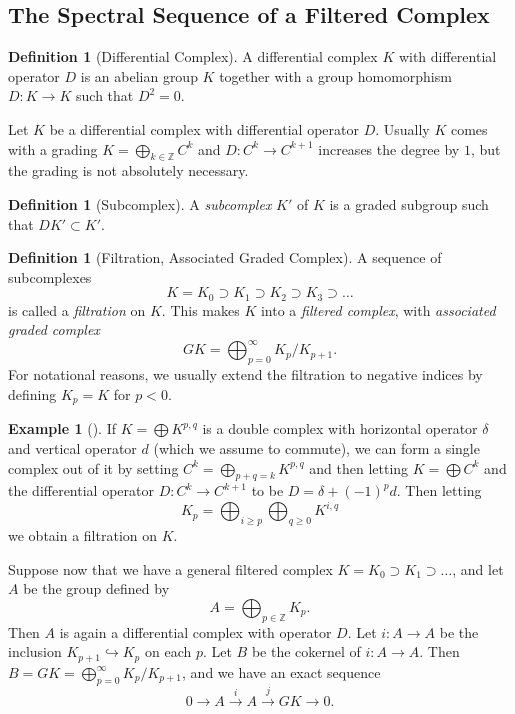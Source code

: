 \documentclass[reqno]{amsart}
\theoremstyle{definition}
\newtheorem{definition}[theorem]{Definition}
\newtheorem{example}[theorem]{Example}
\theoremstyle{remark}
\begin{document}
\subsection{The Spectral Sequence of a Filtered
Complex}

\begin{definition}[Differential Complex]
    A differential complex $K$ with differential operator
    $D$ is an abelian group $K$ together with
    a group homomorphism $D \colon K \to K$ such that
    $D^2 = 0$.
\end{definition}

Let $K$ be a differential complex with differential operator
$D$.
Usually $K$ comes with a grading
$K = \bigoplus_{k \in \mathbb{Z}}C^{k}$ and
$D \colon C^{k} \to C^{k+1}$ increases the
degree by $1$, but the grading is not
absolutely necessary.

\begin{definition}[Subcomplex]
    A \textit{subcomplex} $K'$ of $K$ is a
    graded subgroup such that $DK' \subset 
    K'$.
\end{definition}

\begin{definition}[Filtration, Associated Graded Complex]
    A sequence of subcomplexes
    \[
    K = K_0 \supset K_1 \supset K_2 \supset K_3 \supset
    \ldots
    \] 
    is called a \textit{filtration} on $K$.
    This makes $K$ into a \textit{filtered complex}, with
    \textit{associated graded complex}
    \[
    GK = \bigoplus_{p=0}^{\infty} K_p / K_{p+1}.
    \] 
    For notational reasons, we usually extend the
    filtration to negative indices
    by defining
    $K_p = K$ for $p < 0$.
\end{definition}

\begin{example}[]
    If $K = \bigoplus K^{p,q}$ is a double complex with
    horizontal operator $\delta$ and vertical operator
    $d$ (which we assume
    to commute), we can form a single complex out of it by
    setting $C^{k} = \bigoplus_{p+q=k} K^{p,q}$ and
    then letting
    $K = \bigoplus C^{k}$ and
    the differential operator
    $D \colon C^{k} \to C^{k+1}$ to be
    $D = \delta + (-1)^{p} d$. 
    Then letting
    \[
    K_p = \bigoplus_{i\ge p} \bigoplus_{q \ge 0}
    K^{i,q}
    \] 
    we obtain a filtration on
    $K$.
\end{example}




Suppose now that we have a general filtered
complex $K
= K_0 \supset K_1 \supset \ldots$, and let $A$ be the group defined
by
\[
A = \bigoplus_{p \in \mathbb{Z}} K_p.
\] 
Then $A$ is again a differential complex with
operator $D$.
Let $i \colon A \to A$ be the inclusion
$K_{p+1} \hookrightarrow K_{p}$ on each $p$.
Let $B$ be the cokernel of $i \colon A \to A$.
Then $B = GK =
\bigoplus_{p=0}^{\infty} K_p / K_{p+1}$, and
we have an exact sequence
\[
0 \to A \stackrel{i}{\to} A
\stackrel{j}{\to} GK \to 0.
\] 
\end{document}
